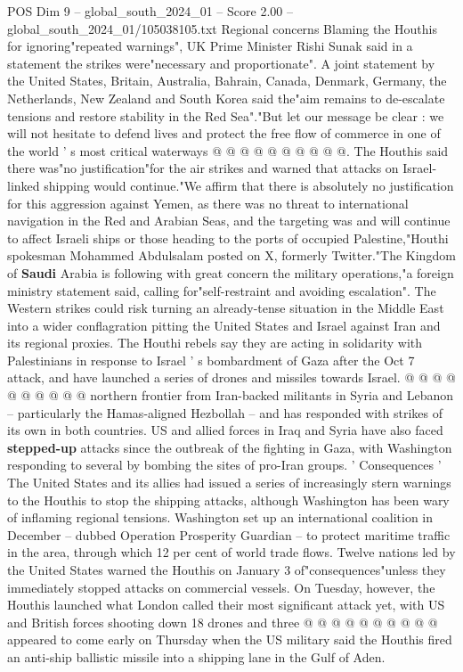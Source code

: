 \begin{textsample}{POS Dim 9 – global\_south\_2024\_01 – Score 2.00 – global\_south\_2024\_01/105038105.txt}
Regional concerns Blaming the Houthis for ignoring"repeated warnings", UK Prime Minister Rishi Sunak said in a statement the strikes were"necessary and proportionate".
A joint statement by the United States, Britain, Australia, Bahrain, Canada, Denmark, Germany, the Netherlands, New Zealand and South Korea said the"aim remains to de-escalate tensions and restore stability in the Red Sea"."But let our message be clear : we will not hesitate to defend lives and protect the free flow of commerce in one of the world ' s most critical waterways @ @ @ @ @ @ @ @ @ @.
The Houthis said there was"no justification"for the air strikes and warned that attacks on Israel-linked shipping would continue."We affirm that there is absolutely no justification for this aggression against Yemen, as there was no threat to international navigation in the Red and Arabian Seas, and the targeting was and will continue to affect Israeli ships or those heading to the ports of occupied Palestine,"Houthi spokesman Mohammed Abdulsalam posted on X, formerly Twitter."The Kingdom of \textbf{Saudi} Arabia is following with great concern the military operations,"a foreign ministry statement said, calling for"self-restraint and avoiding escalation".
The Western strikes could risk turning an already-tense situation in the Middle East into a wider conflagration pitting the United States and Israel against Iran and its regional proxies.
The Houthi rebels say they are acting in solidarity with Palestinians in response to Israel ' s bombardment of Gaza after the Oct 7 attack, and have launched a series of drones and missiles towards Israel. @ @ @ @ @ @ @ @ @ @ northern frontier from Iran-backed militants in Syria and Lebanon -- particularly the Hamas-aligned Hezbollah -- and has responded with strikes of its own in both countries.
US and allied forces in Iraq and Syria have also faced \textbf{stepped-up} attacks since the outbreak of the fighting in Gaza, with Washington responding to several by bombing the sites of pro-Iran groups. ' Consequences ' The United States and its allies had issued a series of increasingly stern warnings to the Houthis to stop the shipping attacks, although Washington has been wary of inflaming regional tensions.
Washington set up an international coalition in December -- dubbed Operation Prosperity Guardian -- to protect maritime traffic in the area, through which 12 per cent of world trade flows.
Twelve nations led by the United States warned the Houthis on January 3 of"consequences"unless they immediately stopped attacks on commercial vessels.
On Tuesday, however, the Houthis launched what London called their most significant attack yet, with US and British forces shooting down 18 drones and three @ @ @ @ @ @ @ @ @ @ appeared to come early on Thursday when the US military said the Houthis fired an anti-ship ballistic missile into a shipping lane in the Gulf of Aden.

\end{textsample}
